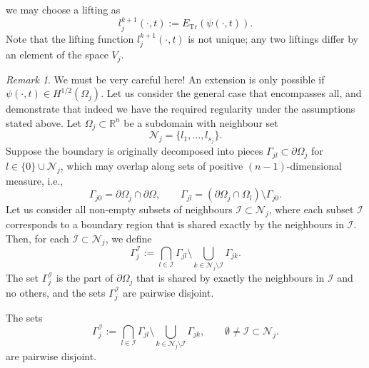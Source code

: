 \documentclass[a4paper, 11pt]{article}
\theoremstyle{remark}
\newtheorem{remark}[equation]{Remark}
\begin{document}
we may choose a lifting as
\begin{equation*}
    l_{j}^{k+1}(\cdot, t) := E_{\text{Tr}}(\psi(\cdot, t)).
\end{equation*}
Note that the lifting function $l_j^{k+1}(\cdot, t)$ is not unique; any two liftings differ by an element of the space $V_{j}$.
\begin{remark}\label{mainremark}
    We must be very careful here! An extension is only possible if $\psi(\cdot, t)\in H^{1/2}(\Omega_{j})$. Let us consider the general case that encompasses all, and demonstrate that indeed we have the required regularity under the assumptions stated above. Let $\Omega_{j}\subset\mathbb{R}^{n}$ be a subdomain with neighbour set 
    \begin{equation*}
        \mathcal{N}_{j} = \{l_{1}, \ldots, l_{s_{j}}\}.
    \end{equation*}
    Suppose the boundary is originally decomposed into pieces $\Gamma_{jl}\subset\partial\Omega_{j}$ for $l\in \{0\}\cup\mathcal{N}_{j}$, which may overlap along sets of positive $(n-1)$-dimensional measure, i.e.,
    \begin{equation*}
        \Gamma_{j0} = \partial \Omega_{j} \cap \partial\Omega, \qquad \Gamma_{jl} = \left(\partial\Omega_{j}\cap\Omega_{l}\right)\setminus \Gamma_{j0}.
    \end{equation*}
    Let us consider all non-empty subsets of neighbours $\mathcal{I}\subset\mathcal{N}_{j}$, where each subset $\mathcal{I}$ corresponds to a boundary region that is shared exactly by the neighbours in $\mathcal{I}$. Then, for each $\mathcal{I}\subset\mathcal{N}_{j}$, we define
    \begin{equation*}
        \Gamma_{j}^{\mathcal{I}} := \bigcap_{l\in\mathcal{I}}\Gamma_{jl}\setminus\bigcup_{k\in\mathcal{N}_{j}\setminus\mathcal{I}}\Gamma_{jk}.
    \end{equation*}
    The set $\Gamma_{j}^{\mathcal{I}}$ is the part of $\partial\Omega_{j}$ that is shared by exactly the neighbours in $\mathcal{I}$ and no others, and the sets $\Gamma_{j}^{\mathcal{I}}$ are pairwise disjoint. 
    \begin{lemma}{}
        The sets
        \begin{equation*}
            \Gamma_{j}^{\mathcal{I}} := \bigcap_{l\in\mathcal{I}}\Gamma_{jl}\setminus\bigcup_{k\in\mathcal{N}_{j}\setminus\mathcal{I}}\Gamma_{jk}, \qquad \emptyset\neq\mathcal{I}\subset\mathcal{N}_{j}.
        \end{equation*}
        are pairwise disjoint.
    \end{lemma}

\end{remark}
\end{document}

